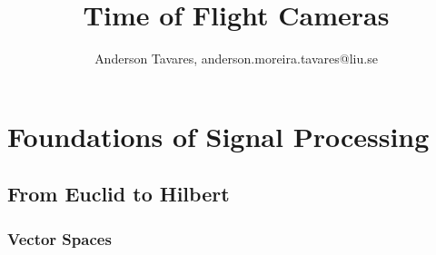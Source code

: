 \documentclass[9pt, twocolumn]{extarticle}
\title{Time of Flight Cameras}
\author{Anderson Tavares, anderson.moreira.tavares@liu.se}
\theoremstyle{definition}
\begin{document}
  \twocolumn[
  \begin{@twocolumnfalse}
    \noindent\centering\parbox{\textwidth}{%
      \centering {\bfseries\fontsize{14}{16}\selectfont\thetitle}\\{\fontsize{12}{14}\selectfont\theauthor}
  }
  
  \end{@twocolumnfalse}
  ]
  \section{Foundations of Signal Processing}
  \subsection{From Euclid to Hilbert}
  \subsubsection{Vector Spaces}
  
\end{document}
